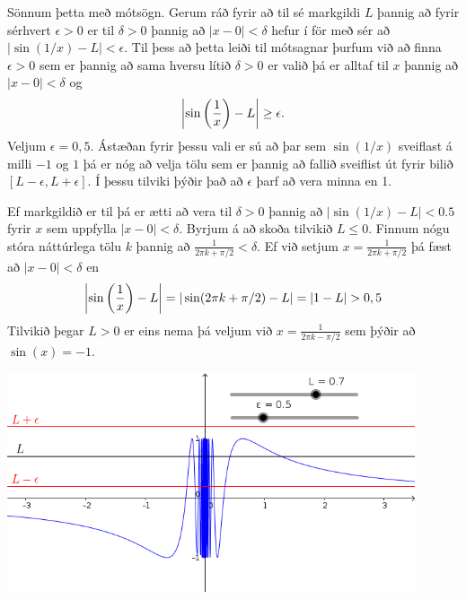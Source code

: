 \documentclass[b5paper,10pt,icelandic]{sphinxmanual}
\begin{document}
Sönnum þetta með mótsögn. Gerum ráð fyrir að til sé markgildi \(L\) þannig að fyrir
sérhvert \(\epsilon >0\) er til \(\delta>0\) þannig að
\(|x-0|<\delta\) hefur í för með sér að \(|\sin(1/x) - L|<\epsilon\). Til þess
að þetta leiði til mótsagnar þurfum við að finna \(\epsilon>0\) sem er þannig að
sama hversu lítið \(\delta>0\) er valið þá er alltaf til \(x\) þannig að
\(|x-0|<\delta\) og
\begin{gather}
\begin{split}\left|\sin\left(\frac 1x \right)-L\right| \geq \epsilon.\end{split}\notag
\end{gather}
Veljum \(\epsilon = 0,5\). Ástæðan fyrir þessu vali er sú að þar sem
\(\sin(1/x)\) sveiflast á milli \(-1\) og \(1\) þá er nóg að
velja tölu sem er þannig að fallið sveiflist út
fyrir bilið \([L-\epsilon,L+\epsilon]\). Í þessu tilviki þýðir það að
\(\epsilon\) þarf að vera minna en 1.

Ef markgildið er til þá er ætti að vera til \(\delta>0\) þannig að
\(|\sin(1/x)-L|< 0.5\) fyrir \(x\) sem uppfylla \(|x-0|<\delta\).
Byrjum á að skoða tilvikið \(L\leq 0\).
Finnum nógu stóra náttúrlega tölu \(k\)
þannig að \(\frac 1{2\pi k + \pi/2} < \delta\).
Ef við setjum \(x=\frac 1{2\pi k + \pi/2}\)
þá fæst að \(|x-0|<\delta\) en
\begin{gather}
\begin{split}\left|\sin\left(\frac 1x \right) - L\right| =
|\sin(2\pi k +\pi/2) - L|  = |1-L| > 0,5\end{split}\notag
\end{gather}
Tilvikið þegar \(L>0\) er eins nema þá veljum við \(x=\frac 1{2\pi k - \pi/2}\)
sem þýðir að \(\sin(x) = -1\).


\begin{center}
\includegraphics[width=12cm,keepaspectratio=true]{03_daemi-sin.png}
\end{center}
\end{document}
